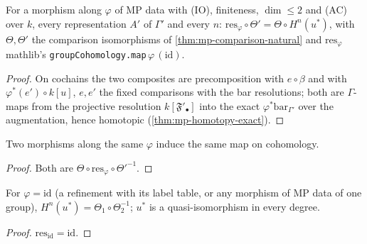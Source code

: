 \begin{theorem}\label{thm:mp-pull-natural}
  \leanok
  For a morphism along $\varphi$ of MP data with (IO), finiteness, $\dim\le2$ and (AC) over $k$, every representation $A'$ of
  $\Gamma'$ and every $n$: $\mathrm{res}_\varphi\circ\Theta'=\Theta\circ H^n(u^*)$, with $\Theta,\Theta'$ the comparison isomorphisms of
  \ref{thm:mp-comparison-natural} and $\mathrm{res}_\varphi$ mathlib's \texttt{groupCohomology.map}\,$\varphi\,(\mathrm{id})$.
\end{theorem}
\begin{proof}
  \leanok
  On cochains the two composites are precomposition with $e\circ\beta$ and with $\varphi^*(e')\circ k[u]$, $e,e'$ the fixed
  comparisons with the bar resolutions; both are $\Gamma$-maps from the projective resolution $k[\mathfrak F'_\bullet]$ into the exact
  $\varphi^*\mathrm{bar}_{\Gamma'}$ over the augmentation, hence homotopic (\ref{thm:mp-homotopy-exact}).
\end{proof}

\begin{theorem}\label{thm:mp-label-indep}
  \leanok
  Two morphisms along the same $\varphi$ induce the same map on cohomology.
\end{theorem}
\begin{proof}
  \leanok
  Both are $\Theta\circ\mathrm{res}_\varphi\circ\Theta'^{-1}$.
\end{proof}

\begin{theorem}\label{thm:mp-refine-invariance}
  \leanok
  For $\varphi=\mathrm{id}$ (a refinement with its label table, or any morphism of MP data of one group), $H^n(u^*)=\Theta_1\circ\Theta_2^{-1}$;
  $u^*$ is a quasi-isomorphism in every degree.
\end{theorem}
\begin{proof}
  \leanok
  $\mathrm{res}_{\mathrm{id}}=\mathrm{id}$.
\end{proof}

